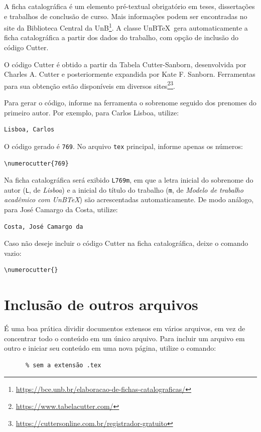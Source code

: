 A ficha catalográfica é um elemento pré-textual obrigatório em teses, dissertações e trabalhos de conclusão de curso. Mais informações podem ser encontradas no site da Biblioteca Central da UnB\footnote{\url{https://bce.unb.br/elaboracao-de-fichas-catalograficas/}}. A classe UnB\TeX\ gera automaticamente a ficha catalográfica a partir dos dados do trabalho, com opção de inclusão do código Cutter.

O código Cutter é obtido a partir da Tabela Cutter-Sanborn, desenvolvida por Charles A. Cutter e posteriormente expandida por Kate F. Sanborn. Ferramentas para sua obtenção estão disponíveis em diversos sites\footnote{\url{https://www.tabelacutter.com/}}\footnote{\url{https://cuttersonline.com.br/registrador-gratuito}}.

Para gerar o código, informe na ferramenta o sobrenome seguido dos prenomes do primeiro autor. Por exemplo, para Carlos Lisboa, utilize:
\begin{verbatim}
Lisboa, Carlos
\end{verbatim}
O código gerado é \texttt{769}. No arquivo \texttt{tex} principal, informe apenas os números:
\begin{verbatim}
\numerocutter{769}
\end{verbatim}
Na ficha catalográfica será exibido \texttt{L769m}, em que a letra inicial do sobrenome do autor (\texttt{L}, de \emph{Lisboa}) e a inicial do título do trabalho (\texttt{m}, de \emph{Modelo de trabalho acadêmico com UnB\TeX}) são acrescentadas automaticamente. De modo análogo, para José Camargo da Costa, utilize:
\begin{verbatim}
Costa, José Camargo da
\end{verbatim}

Caso não deseje incluir o código Cutter na ficha catalográfica, deixe o comando vazio:
\begin{verbatim}
\numerocutter{}
\end{verbatim}

\section{Inclusão de outros arquivos}\label{sec:include}

É uma boa prática dividir documentos extensos em vários arquivos, em vez de concentrar todo o conteúdo em um único arquivo. Para incluir um arquivo em outro e iniciar seu conteúdo em uma nova página, utilize o comando:
\begin{verbatim}
      % sem a extensão .tex
\end{verbatim}

